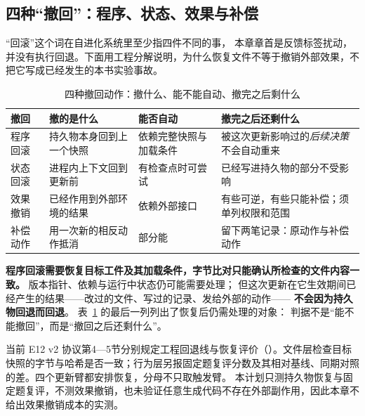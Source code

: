 \subsection{四种``撤回''：程序、状态、效果与补偿}
\label{sec:ch14-undo-kinds}

``回滚''这个词在自进化系统里至少指四件不同的事，
本章章首是反馈标签扰动，并没有执行回退。下面用工程分解说明，为什么恢复文件不等于撤销外部效果，不把它写成已经发生的本书实验事故。

\begin{table}[htbp]
\centering
\caption{四种撤回动作：撤什么、能不能自动、撤完之后剩什么}
\label{tab:ch14-undo}
\begin{tabular}{>{\raggedright\arraybackslash}p{2.4cm}>{\raggedright\arraybackslash}p{3.6cm}>{\raggedright\arraybackslash}p{2.2cm}>{\raggedright\arraybackslash}p{4.8cm}}
\toprule
撤回 & 撤的是什么 & 能否自动 & 撤完之后还剩什么 \\
\midrule
程序回滚 & 持久物本身回到上一个快照 & 依赖完整快照与加载条件 & 被这次更新影响过的\emph{后续决策}不会自动重来 \\
状态回滚 & 进程内上下文回到更新前 & 有检查点时可尝试 & 已经写进持久物的部分不受影响 \\
效果撤销 & 已经作用到外部环境的结果 & 依赖外部接口 & 有些可逆，有些只能补偿；须单列权限和范围 \\
补偿动作 & 用一次新的相反动作抵消 & 部分能 & 留下两笔记录：原动作与补偿动作 \\
\bottomrule
\end{tabular}
\end{table}

\begin{principlebox}
\textbf{程序回滚需要恢复目标工件及其加载条件，字节比对只能确认所检查的文件内容一致。}
版本指针、依赖与运行中状态仍可能需要处理；
但这次更新在它生效期间已经产生的结果——改过的文件、写过的记录、发给外部的动作——
\textbf{不会因为持久物回退而回退}。
表~\ref{tab:ch14-undo} 的最后一列列出了恢复后仍需处理的对象：
判据不是“能不能撤回”，而是“撤回之后还剩什么”。
\end{principlebox}

\begin{sloppypar}
当前 E12 v2 协议第4—5节分别规定工程回退线与恢复评价（）。文件层检查目标快照的字节与哈希是否一致；行为层另报固定题复评分数及其相对基线、同期对照的差。四个更新臂都安排恢复，分母不只取触发臂。
本计划只测持久物恢复与固定题复评，不测效果撤销，也未验证任意生成代码不存在外部副作用，因此本章不给出效果撤销成本的实测。
\end{sloppypar}


